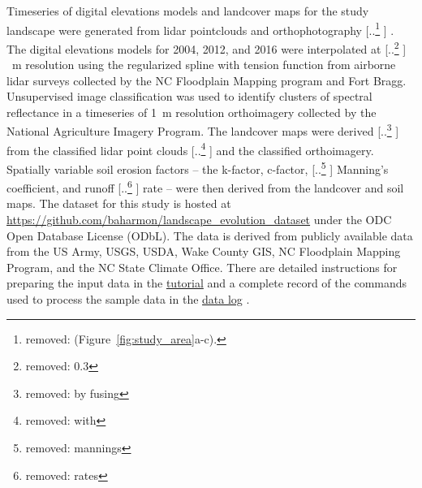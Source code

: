 \documentclass[gmd, manuscript]{copernicus}
\providecommand{\DIFadd}[1]{{\protect\color{blue} \sf #1}} %
\providecommand{\DIFdel}[1]{{\protect\color{red} [..\footnote{removed: #1} ]}} %
\providecommand{\DIFaddbegin}{} %
\providecommand{\DIFaddend}{} %
\providecommand{\DIFdelbegin}{} %
\providecommand{\DIFdelend}{} %
\begin{document}
Timeseries of digital elevations models 
and landcover maps for the study landscape
were generated from lidar pointclouds and orthophotography\DIFdelbegin \DIFdel{(Figure~\ref{fig:study_area}a-c).
}\DIFdelend \DIFaddbegin \DIFadd{.
}\DIFaddend The digital elevations models for 2004, 2012, and 2016
were interpolated at \DIFdelbegin \DIFdel{0.3}\DIFdelend \DIFaddbegin \DIFadd{1}\DIFaddend ~\unit{m} resolution
using the regularized spline with tension function \citep{Mitasova1993,Mitasova2005}
from airborne lidar surveys 
collected by the NC Floodplain Mapping program and Fort Bragg. 
%
Unsupervised image classification 
was used to identify clusters of spectral reflectance
in a timeseries of 1~\unit{m} resolution orthoimagery 
collected by the National Agriculture Imagery Program.
The landcover maps were derived \DIFdelbegin \DIFdel{by fusing }\DIFdelend \DIFaddbegin \DIFadd{from }\DIFaddend the
classified lidar point clouds \DIFdelbegin \DIFdel{with }\DIFdelend \DIFaddbegin \DIFadd{and }\DIFaddend the classified orthoimagery.
Spatially variable soil erosion factors 
-- \DIFaddbegin \DIFadd{the }\DIFaddend k-factor, c-factor, \DIFdelbegin \DIFdel{mannings}\DIFdelend \DIFaddbegin \DIFadd{Manning's coefficient}\DIFaddend , and runoff \DIFdelbegin \DIFdel{rates }\DIFdelend \DIFaddbegin \DIFadd{rate }\DIFaddend --
were \DIFaddbegin \DIFadd{then }\DIFaddend derived from the landcover and soil maps.
The dataset for this study is hosted at 
\url{https://github.com/baharmon/landscape\_evolution_dataset}
under the ODC Open Database License (ODbL).
The data is derived from publicly available data from
the US Army, USGS, USDA, Wake County GIS, NC Floodplain
Mapping Program, and the NC State Climate Office.
\DIFaddbegin \DIFadd{There are detailed instructions for preparing the input data in the 
}\href{https://github.com/baharmon/landscape_evolution/blob/master/tutorial.md}{tutorial}
\DIFadd{and a complete record of the commands used to process the sample data in the
}\href{https://github.com/baharmon/landscape_evolution_dataset/blob/master/nc_spm_evolution/DATA.md}{data log}\DIFadd{.
}\DIFaddend 
\end{document}
